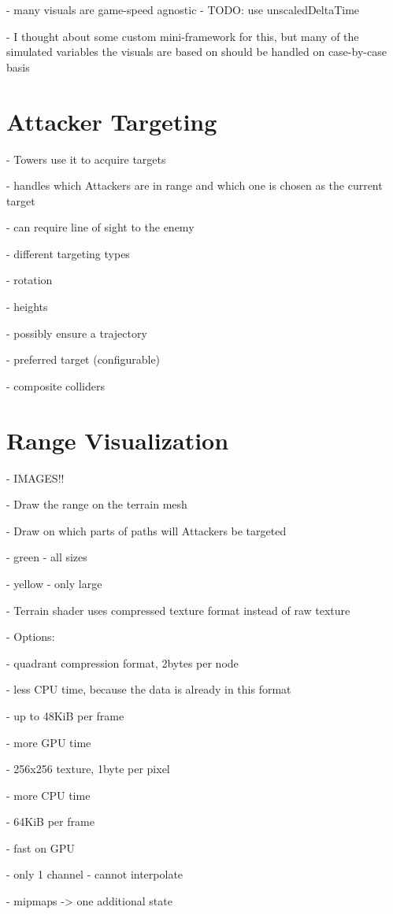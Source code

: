 - many visuals are game-speed agnostic     - TODO: use unscaledDeltaTime

- I thought about some custom mini-framework for this, but many of the simulated variables the visuals are based on should be handled on case-by-case basis

\section{Attacker Targeting}

- Towers use it to acquire targets

- handles which Attackers are in range and which one is chosen as the current target

- can require line of sight to the enemy

- different targeting types

- rotation

- heights

- possibly ensure a trajectory

- preferred target (configurable)

- composite colliders

\section{Range Visualization}

- IMAGES!!

- Draw the range on the terrain mesh

- Draw on which parts of paths will Attackers be targeted

- green - all sizes

- yellow - only large

- Terrain shader uses compressed texture format instead of raw texture

- Options:

- quadrant compression format, 2bytes per node

- less CPU time, because the data is already in this format

- up to 48KiB per frame

- more GPU time

- 256x256 texture, 1byte per pixel

- more CPU time

- 64KiB per frame

- fast on GPU

- only 1 channel - cannot interpolate

- mipmaps -> one additional state

